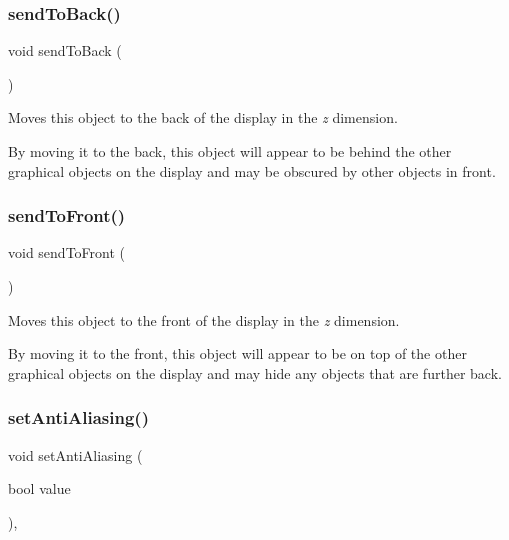 \subsubsection{\texorpdfstring{send\+To\+Back()}{sendToBack()}}
{\footnotesize\ttfamily void send\+To\+Back (\begin{DoxyParamCaption}{ }\end{DoxyParamCaption})\hspace{0.3cm}{\ttfamily [inherited]}}



Moves this object to the back of the display in the {\itshape z} dimension. 

By moving it to the back, this object will appear to be behind the other graphical objects on the display and may be obscured by other objects in front. \mbox{\label{classGObject_aee33d68488e46827ef55fac07f40a9b2}} 
\subsubsection{\texorpdfstring{send\+To\+Front()}{sendToFront()}}
{\footnotesize\ttfamily void send\+To\+Front (\begin{DoxyParamCaption}{ }\end{DoxyParamCaption})\hspace{0.3cm}{\ttfamily [inherited]}}



Moves this object to the front of the display in the {\itshape z} dimension. 

By moving it to the front, this object will appear to be on top of the other graphical objects on the display and may hide any objects that are further back. \mbox{\label{classGObject_a1e43371668ae850193cebedb44e1bbe3}} 
\subsubsection{\texorpdfstring{set\+Anti\+Aliasing()}{setAntiAliasing()}}
{\footnotesize\ttfamily void set\+Anti\+Aliasing (\begin{DoxyParamCaption}\item[{bool}]{value }\end{DoxyParamCaption})\hspace{0.3cm}{\ttfamily [static]}, {\ttfamily [inherited]}}



